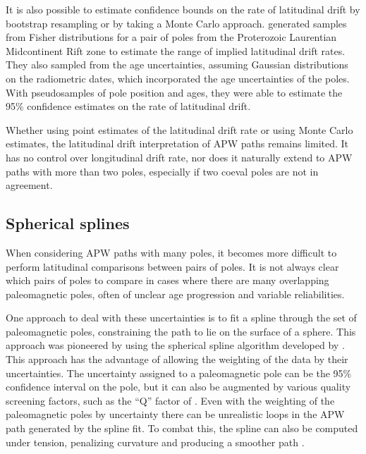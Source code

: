 \documentclass[preprint,12pt,authoryear]{elsarticle}
\begin{document}
It is also possible to estimate confidence bounds on the rate of latitudinal drift by
bootstrap resampling \citep[e.g.][]{tarduno1990fast} or by taking a Monte Carlo approach. 
\citet{swanson2014confirmation} generated samples from Fisher distributions
for a pair of poles from the Proterozoic Laurentian Midcontinent Rift zone to estimate the range
of implied latitudinal drift rates. They also sampled from the age uncertainties, assuming
Gaussian distributions on the radiometric dates, which incorporated the age uncertainties of the poles.
With pseudosamples of pole position and ages, they were able to estimate the 95\% 
confidence estimates on the rate of latitudinal drift.

Whether using point estimates of the latitudinal drift rate or using Monte Carlo estimates, 
the latitudinal drift interpretation of APW paths remains limited.
It has no control over longitudinal drift rate, 
nor does it naturally extend to APW paths with more than two poles, 
especially if two coeval poles are not in agreement.

\subsection{Spherical splines}

When considering APW paths with many poles, it becomes more difficult to perform
latitudinal comparisons between pairs of poles. It is not always clear which pairs of
poles to compare in cases where there are many overlapping paleomagnetic poles,
often of unclear age progression and variable reliabilities.

One approach to deal with these uncertainties is to fit a spline through the
set of paleomagnetic poles, constraining the path to lie on the surface of a sphere.
This approach was pioneered by \citet{torsvik1992baltica} using the spherical spline
algorithm developed by \citet{jupp1987fitting}.
This approach has the advantage of allowing the weighting of the data by their
uncertainties. The uncertainty assigned to a paleomagnetic pole can
be the 95\% confidence interval on the pole, but it can also be augmented
by various quality screening factors, such as the ``Q'' factor of \citet{van1990reliability} \citep{torsvik1992baltica}. 
Even with the weighting of the paleomagnetic poles by uncertainty there
can be unrealistic loops in the APW path generated by the spline fit.
To combat this, the spline can also be computed under tension, penalizing
curvature and producing a smoother path \citep{torsvik1996continental}.
\end{document}
